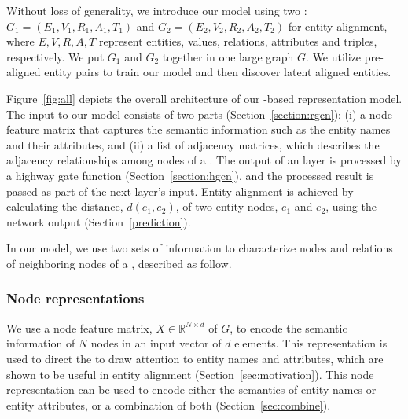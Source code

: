  Without loss of generality, we introduce our model using two \KGs: $G_1 = (E_1,V_1,R_1,A_1,T_1)$ and $G_2 =
(E_2,V_2,R_2,A_2,T_2)$ for entity alignment, where $E,V,R,A,T$ represent entities, values, relations, attributes and triples, respectively. 	
We put $G_1$ and $G_2$ together in one large graph $G$. We utilize pre-aligned entity pairs to train our model and then discover latent
aligned entities.



 Figure~\ref{fig:all} depicts the overall architecture of our \RGCN-based \KG representation model. 		
The input to our model consists of two parts (Section~\ref{section:rgcn}): (i) a node feature matrix that captures the semantic information
such as the entity names and their attributes, and (ii) a list of adjacency matrices, which describes the adjacency relationships among
nodes of a \KG. The output of an \RGCN layer is processed by a highway gate function (Section~\ref{section:hgcn}), and the processed result
is passed as part of the next layer's input. Entity alignment is achieved by calculating the distance, $d(e_1, e_2)$, of two entity nodes,
$e_1$ and $e_2$, using the network output (Section~\ref{prediction}).



In our model, we use two sets of information to characterize nodes and relations of neighboring nodes of a \KG, described as follow.




%



\subsubsection{Node representations}
	\label{subsection:Node Representations}
   We use a node feature matrix, $X \in \mathbb{R}^{N \times d}$ of $G$, to encode the semantic information of $N$ nodes in an input vector of $d$ elements. This representation is used to direct the \RGCN to draw attention to entity names and attributes, which are shown to be useful in entity alignment (Section~\ref{sec:motivation}). This node representation can be used to encode either the semantics of entity names or entity attributes, or a combination of both (Section~\ref{sec:combine}).


